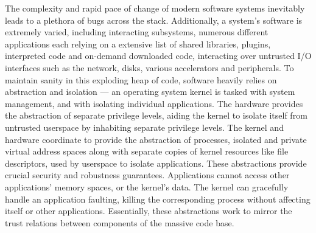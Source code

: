 The complexity and rapid pace of change of modern software systems inevitably
leads to a plethora of bugs across the stack.
Additionally, a system's software is extremely varied, including interacting
subsystems, numerous different applications each relying on a extensive list
of shared libraries, plugins, interpreted code and on-demand downloaded
code, interacting over untrusted I/O interfaces such as the network, disks, 
various accelerators and peripherals.
To maintain sanity in this exploding heap of code, software heavily relies on
abstraction and isolation ---
an operating system kernel is tasked with system management, and with 
isolating individual applications.
The hardware provides the abstraction of separate privilege levels, aiding
the kernel to isolate itself from untrusted userspace by inhabiting separate
privilege levels.
The kernel and hardware coordinate to provide the abstraction of processes,
isolated and private virtual address spaces along with separate copies of
kernel resources like file descriptors, used by userspace to isolate
applications.
These abstractions provide crucial security and robustness guarantees.
Applications cannot access other applications' memory spaces, or the
kernel's data.
The kernel can gracefully handle an application faulting, killing the
corresponding process without affecting itself or other applications.
Essentially, these abstractions work to mirror the trust relations between
components of the massive code base.

